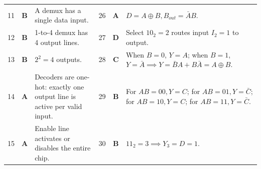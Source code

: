 \begin{table}[htbp]
\begin{tabularx}{\textwidth}{l c X l c X}
11 & \textbf{B} & A demux has a single data input. & 26 & \textbf{A} & $D = A \oplus B, B_{out} = \bar{A}B$. \\
12 & \textbf{B} & 1-to-4 demux has 4 output lines. & 27 & \textbf{D} & Select $10_2 = 2$ routes input $I_2 = 1$ to output. \\
13 & \textbf{B} & $2^2 = 4$ outputs. & 28 & \textbf{C} & When $B=0$, $Y = A$; when $B=1$, $Y = \bar{A} \implies Y = \bar{B}A + B\bar{A} = A \oplus B$. \\
14 & \textbf{A} & Decoders are one-hot: exactly one output line is active per valid input. & 29 & \textbf{B} & For $AB=00, Y=C$; for $AB=01, Y=\bar{C}$; for $AB=10, Y=C$; for $AB=11, Y=\bar{C}$. \\
15 & \textbf{A} & Enable line activates or disables the entire chip. & 30 & \textbf{B} & $11_2 = 3 \implies Y_3 = D = 1$. \\
\bottomrule
\end{tabularx}
\end{table}

